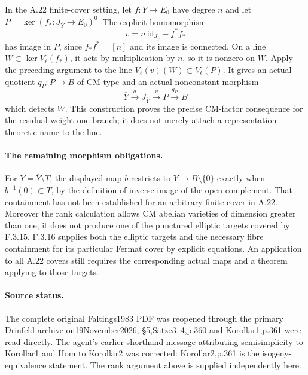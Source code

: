 In the A.22 finite-cover setting, let
$f:\overline Y\to E_0$ have degree $n$ and let
$P=\ker(f_*:J_{\overline Y}\to E_0)^0$.
The explicit homomorphism
\[
 v=n\,\mathrm{id}_{J_{\overline Y}}-f^*f_*
\]
has image in $P$, since $f_*f^*=[n]$ and its image is connected.
On a line $W\subset\ker V_\ell(f_*)$, it acts by multiplication by
$n$, so it is nonzero on $W$. Apply the preceding argument to the
line $V_\ell(v)(W)\subset V_\ell(P)$. It gives an actual quotient
$q_P:P\to B$ of CM type and an actual nonconstant morphism
\[
 \overline Y\xrightarrow{a}J_{\overline Y}
 \xrightarrow{v}P\xrightarrow{q_P}B
\]
which detects $W$. This construction proves the precise CM-factor
consequence for the residual weight-one branch; it does not merely
attach a representation-theoretic name to the line.

\paragraph{The remaining morphism obligations.}
For $Y=\overline Y\setminus T$, the displayed map $b$ restricts to
$Y\to B\setminus\{0\}$ exactly when $b^{-1}(0)\subset T$, by the
definition of inverse image of the open complement. That containment
has not been established for an arbitrary finite cover in A.22.
Moreover the rank calculation allows CM abelian varieties of dimension
greater than one; it does not produce one of the punctured elliptic
targets covered by F.3.15. F.3.16 supplies both the elliptic targets and
the necessary fibre containment for its particular Fermat cover by
explicit equations. An application to all A.22 covers still requires
the corresponding actual maps and a theorem applying to those targets.

\paragraph{Source status.}
The complete original Faltings1983 PDF was reopened through the primary
Drinfeld archive on19November2026; \S5,S\"atze3--4,p.360 and
Korollar1,p.361 were read directly. The agent's earlier shorthand
message attributing semisimplicity to Korollar1 and Hom to Korollar2
was corrected: Korollar2,p.361 is the isogeny-equivalence statement.
The rank argument above is supplied independently here.
